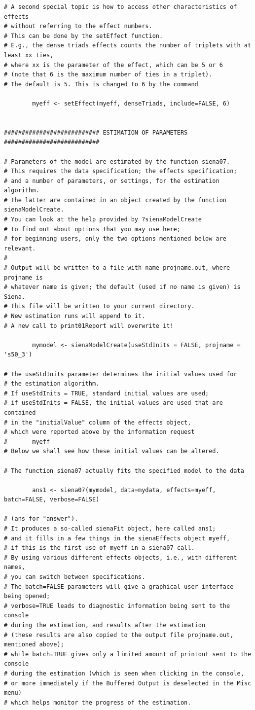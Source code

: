 \documentclass[a4paper,fleqn]{article}
\newcommand{\+}{\, + \,}
\begin{document}
{\begin{verbatim}
# A second special topic is how to access other characteristics of effects
# without referring to the effect numbers.
# This can be done by the setEffect function.
# E.g., the dense triads effects counts the number of triplets with at least xx ties,
# where xx is the parameter of the effect, which can be 5 or 6
# (note that 6 is the maximum number of ties in a triplet).
# The default is 5. This is changed to 6 by the command

        myeff <- setEffect(myeff, denseTriads, include=FALSE, 6)


########################### ESTIMATION OF PARAMETERS ###########################

# Parameters of the model are estimated by the function siena07.
# This requires the data specification; the effects specification;
# and a number of parameters, or settings, for the estimation algorithm.
# The latter are contained in an object created by the function sienaModelCreate.
# You can look at the help provided by ?sienaModelCreate
# to find out about options that you may use here;
# for beginning users, only the two options mentioned below are relevant.
#
# Output will be written to a file with name projname.out, where projname is
# whatever name is given; the default (used if no name is given) is Siena.
# This file will be written to your current directory.
# New estimation runs will append to it.
# A new call to print01Report will overwrite it!

        mymodel <- sienaModelCreate(useStdInits = FALSE, projname = 's50_3')

# The useStdInits parameter determines the initial values used for
# the estimation algorithm.
# If useStdInits = TRUE, standard initial values are used;
# if useStdInits = FALSE, the initial values are used that are contained
# in the "initialValue" column of the effects object,
# which were reported above by the information request
#       myeff
# Below we shall see how these initial values can be altered.

# The function siena07 actually fits the specified model to the data

        ans1 <- siena07(mymodel, data=mydata, effects=myeff, batch=FALSE, verbose=FALSE)

# (ans for "answer").
# It produces a so-called sienaFit object, here called ans1;
# and it fills in a few things in the sienaEffects object myeff,
# if this is the first use of myeff in a siena07 call.
# By using various different effects objects, i.e., with different names,
# you can switch between specifications.
# The batch=FALSE parameters will give a graphical user interface being opened;
# verbose=TRUE leads to diagnostic information being sent to the console
# during the estimation, and results after the estimation
# (these results are also copied to the output file projname.out, mentioned above);
# while batch=TRUE gives only a limited amount of printout sent to the console
# during the estimation (which is seen when clicking in the console,
# or more immediately if the Buffered Output is deselected in the Misc menu)
# which helps monitor the progress of the estimation.


\end{verbatim}}
\end{document}
